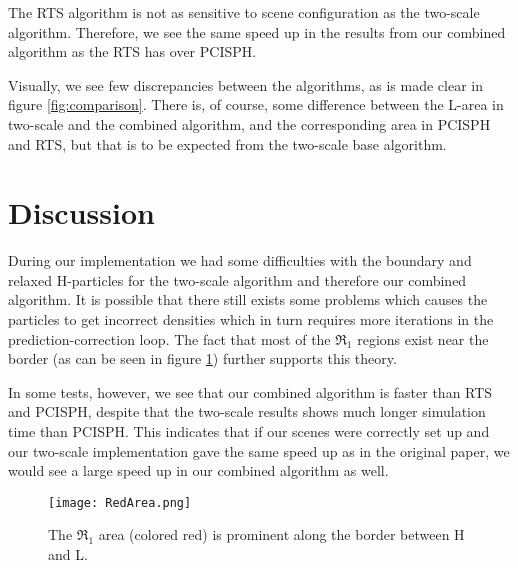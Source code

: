 \documentclass[../../main.tex]{subfiles}
\begin{document}
The RTS algorithm is not as sensitive to scene configuration as the two-scale algorithm. 
Therefore, we see the same speed up in the results from our combined algorithm as the RTS has over PCISPH. 

Visually, we see few discrepancies between the algorithms, as is made clear in figure \ref{fig:comparison}. There is, of course, some difference between the L-area in two-scale and the combined algorithm, and the corresponding area in PCISPH and RTS, but that is to be expected from the two-scale base algorithm. 



\section{Discussion}

During our implementation we had some difficulties with the boundary and relaxed H-particles for the two-scale algorithm and therefore our combined algorithm. It is possible that there still exists some problems which causes the particles to get incorrect densities which in turn requires more iterations in the prediction-correction loop. The fact that most of the $\Re_1$ regions exist near the border (as can be seen in figure \ref{fig:redarea}) further supports this theory. 

In some tests, however, we see that our combined algorithm is faster than RTS and PCISPH, despite that the two-scale results shows much longer simulation time than PCISPH. This indicates that if our scenes were correctly set up and our two-scale implementation gave the same speed up as in the original paper, we would see a large speed up in our combined algorithm as well. 


\begin{figure}[h]
    \centering
    \texttt{[image: RedArea.png]}
    \caption{The $\Re_1$ area (colored red) is prominent along the border between H and L. }
    \label{fig:redarea}
\end{figure}
\end{document}
